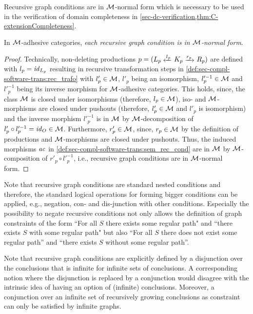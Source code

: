 Recursive graph conditions are in ${\cal M}$-normal form which is necessary to be used in the verification of domain completeness in \cref{sec-dc-verification,thm:C-extensionCompleteness}.

\begin{proposition}
\label{prop:sec-compl-software-trans:rec_cond_constr_m_norm}
In ${\cal M}$-adhesive categories, \emph{each recursive graph condition is in ${\cal M}$-normal form}.
\envEndMarker
\end{proposition}

\begin{proof}
Technically, non-deleting productions $p=(L_p \transB{l_p} K_p \trans{r_p} R_p)$ are defined with $l_p=\mathit{id}_{L_p}$ resulting in recursive transformation steps in \cref{def:sec-compl-software-trans:rec_trafo} with $l'_p \in {\cal M}$, $l'_p$ being an isomorphism, $l'^{-1}_p \in {\cal M}$ and $l'^{-1}_p$ being its inverse morphism for ${\cal M}$-adhesive categories.
This holds, since, the class ${\cal M}$ is closed under isomorphisms (therefore, $l_p \in {\cal M}$), iso- and ${\cal M}$-morphisms are closed under pushouts (therefore, $l'_p \in {\cal M}$ and $l'_p$ is isomorphism) and the inverse morphism $l'^{-1}_p$ is in ${\cal M}$ by ${\cal M}$-decomposition of $l'_p \circ l'^{-1}_p=\mathit{id}_O \in {\cal M}$.
Furthermore, $r'_p \in {\cal M}$, since, $r_p \in {\cal M}$ by the definition of productions and ${\cal M}$-morphisms are closed under pushouts.
Thus, the induced morphisms $\mathit{ac}$ in \cref{def:sec-compl-software-trans:sem_rec_cond} are in ${\cal M}$ by ${\cal M}$-composition of $r'_p \circ l'^{-1}_p$, i.e., recursive graph conditions are in ${\cal M}$-normal form.
\end{proof}

Note that recursive graph conditions are standard nested conditions and therefore, the standard logical operations for forming bigger conditions can be applied, e.g., negation, con- and dis-junction with other conditions.
Especially the possibility to negate recursive conditions not only allows the definition of graph constraints of the form ``For all $S$ there exists some regular path" and ``there exists $S$ with some regular path" but also ``For all $S$ there does not exist some regular path'' and ``there exists $S$ without some regular path''.

\begin{remark}
Note that recursive graph conditions are explicitly defined by a disjunction over the conclusions that is infinite for infinite sets of conclusions.
A corresponding notion where the disjunction is replaced by a conjunction would disagree with the intrinsic idea of having an option of (infinite) conclusions.
Moreover, a conjunction over an infinite set of recursively growing conclusions as constraint can only be satisfied by infinite graphs. 
\envEndMarker
\end{remark}

